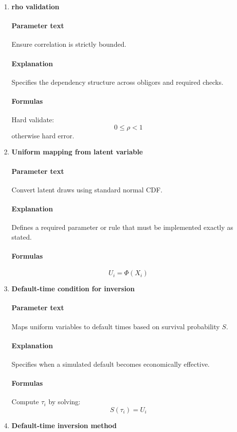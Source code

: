\documentclass[11pt]{article}
\begin{document}
\begin{enumerate}[label=\arabic*),leftmargin=*,align=left]
\item \textbf{rho validation}
\paragraph{Parameter text} Ensure correlation is strictly bounded.
\paragraph{Explanation} Specifies the dependency structure across obligors and required checks.
\paragraph{Formulas} Hard validate:
\[ 0 \le \rho < 1 \]
otherwise hard error.

\item \textbf{Uniform mapping from latent variable}
\paragraph{Parameter text} Convert latent draws using standard normal CDF.
\paragraph{Explanation} Defines a required parameter or rule that must be implemented exactly as stated.
\paragraph{Formulas} 
\[ U_i = \Phi(X_i) \]

\item \textbf{Default-time condition for inversion}
\paragraph{Parameter text} Maps uniform variables to default times based on survival probability $S$.
\paragraph{Explanation} Specifies when a simulated default becomes economically effective.
\paragraph{Formulas} Compute $\tau_i$ by solving:
\[ S(\tau_i) = U_i \]

\item \textbf{Default-time inversion method}

\end{enumerate}
\end{document}
